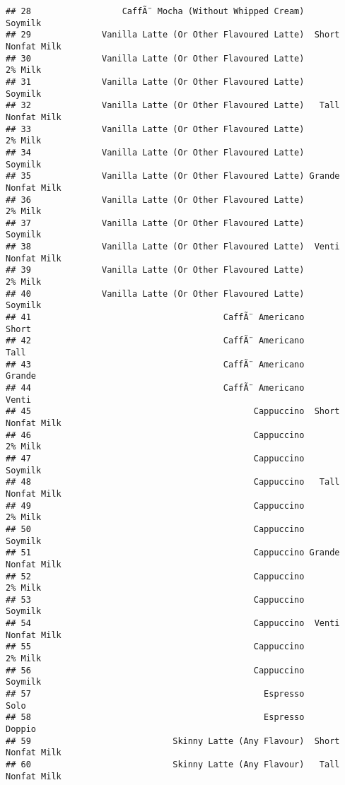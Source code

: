 \documentclass[
]{article}
\begin{document}
\begin{verbatim}
## 28                  CaffÃ¨ Mocha (Without Whipped Cream)            Soymilk
## 29              Vanilla Latte (Or Other Flavoured Latte)  Short Nonfat Milk
## 30              Vanilla Latte (Or Other Flavoured Latte)            2% Milk
## 31              Vanilla Latte (Or Other Flavoured Latte)            Soymilk
## 32              Vanilla Latte (Or Other Flavoured Latte)   Tall Nonfat Milk
## 33              Vanilla Latte (Or Other Flavoured Latte)            2% Milk
## 34              Vanilla Latte (Or Other Flavoured Latte)            Soymilk
## 35              Vanilla Latte (Or Other Flavoured Latte) Grande Nonfat Milk
## 36              Vanilla Latte (Or Other Flavoured Latte)            2% Milk
## 37              Vanilla Latte (Or Other Flavoured Latte)            Soymilk
## 38              Vanilla Latte (Or Other Flavoured Latte)  Venti Nonfat Milk
## 39              Vanilla Latte (Or Other Flavoured Latte)            2% Milk
## 40              Vanilla Latte (Or Other Flavoured Latte)            Soymilk
## 41                                      CaffÃ¨ Americano              Short
## 42                                      CaffÃ¨ Americano               Tall
## 43                                      CaffÃ¨ Americano             Grande
## 44                                      CaffÃ¨ Americano              Venti
## 45                                            Cappuccino  Short Nonfat Milk
## 46                                            Cappuccino            2% Milk
## 47                                            Cappuccino            Soymilk
## 48                                            Cappuccino   Tall Nonfat Milk
## 49                                            Cappuccino            2% Milk
## 50                                            Cappuccino            Soymilk
## 51                                            Cappuccino Grande Nonfat Milk
## 52                                            Cappuccino            2% Milk
## 53                                            Cappuccino            Soymilk
## 54                                            Cappuccino  Venti Nonfat Milk
## 55                                            Cappuccino            2% Milk
## 56                                            Cappuccino            Soymilk
## 57                                              Espresso               Solo
## 58                                              Espresso             Doppio
## 59                            Skinny Latte (Any Flavour)  Short Nonfat Milk
## 60                            Skinny Latte (Any Flavour)   Tall Nonfat Milk

\end{verbatim}
\end{document}

